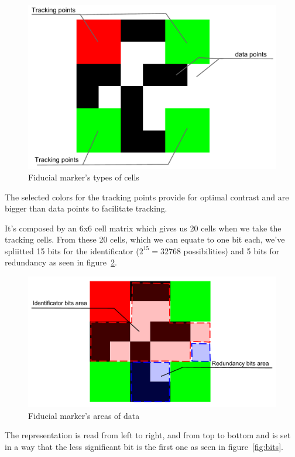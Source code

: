 \documentclass[DIV=calc, paper=a4, fontsize=11pt, twocolumn]{scrartcl}	 %
\begin{document}
\begin{figure}[!h]
    \centering
    \includegraphics[width=0.9\columnwidth]{marker1.pdf}
    \caption{Fiducial marker's types of cells}
    \label{fig:marker1}
\end{figure}

The selected colors for the tracking points provide for optimal contrast and are bigger than data points to facilitate tracking. 


It's composed by an 6x6 cell matrix which gives us 20 cells when we take the tracking cells. From these 20 cells, which we can equate to one bit each, we’ve spliitted 15 bits for the identificator ($2^{15} = 32768$ possibilities) and 5 bits for redundancy as seen in figure~\ref{fig:marker2}.

\begin{figure}[!h]
    \centering
    \includegraphics[width=1.0\columnwidth]{marker2.pdf}
    \caption{Fiducial marker's areas of data}
    \label{fig:marker2}
\end{figure}

The representation is read from left to right, and from top to bottom and is set in a way that the less significant bit is the first one as seen in figure~\ref{fig:bits}.
\end{document}
